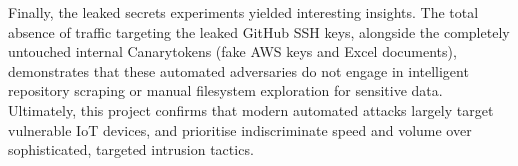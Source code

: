 \documentclass[]{article}
\begin{document}
Finally, the leaked secrets experiments yielded interesting insights. The total absence of traffic targeting the leaked GitHub SSH keys, alongside the completely untouched internal Canarytokens (fake AWS keys and Excel documents), demonstrates that these automated adversaries do not engage in intelligent repository scraping or manual filesystem exploration for sensitive data. Ultimately, this project confirms that modern automated attacks largely target vulnerable IoT devices, and prioritise indiscriminate speed and volume over sophisticated, targeted intrusion tactics.




\end{document}
